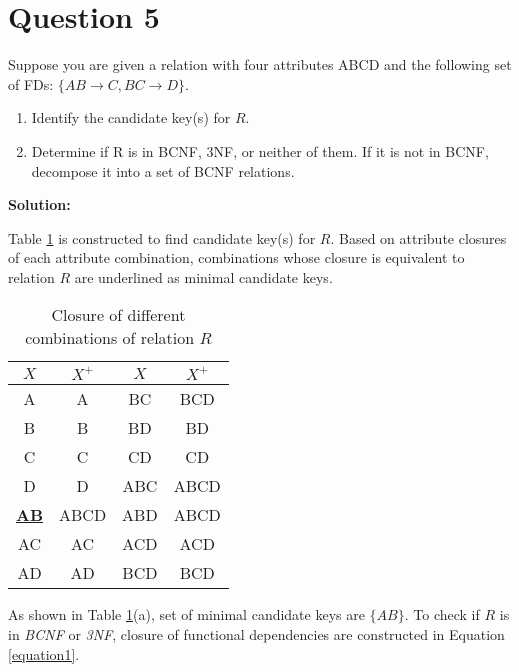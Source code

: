 
\section*{Question 5}

Suppose you are given a relation with four attributes ABCD and the following set of FDs: $\{AB\rightarrow C, BC\rightarrow D\}$.

\begin{enumerate}[label=(\alph*)]
\item Identify the candidate key(s) for $R$.
\item Determine if R is in BCNF, 3NF, or neither of them.
If it is not in BCNF, decompose it into a set of BCNF relations.
\end{enumerate}

\textbf{Solution:}

Table \ref{table1} is constructed to find candidate key(s) for $R$.
Based on attribute closures of each attribute combination, combinations whose closure is equivalent to relation $R$ are underlined as minimal candidate keys.

\begin{table}[H]
\centering\caption{Closure of different combinations of relation $R$}\label{table1}
\begin{tabular}{|c|c||c|c|}
\hline
$X$ & $X^+$ & $X$ & $X^+$\\
\hline
A & A & BC & BCD\\
B & B & BD & BD\\
C & C & CD & CD\\
D & D & ABC & ABCD\\
\underline{\bf AB} & ABCD & ABD & ABCD\\
AC & AC & ACD & ACD\\
AD & AD & BCD & BCD\\
\hline
\end{tabular}
\end{table}

As shown in Table \ref{table1}(a), set of minimal candidate keys are $\{AB\}$.
To check if $R$ is in \textit{BCNF} or \textit{3NF}, closure of functional dependencies are constructed in Equation \ref{equation1}.


